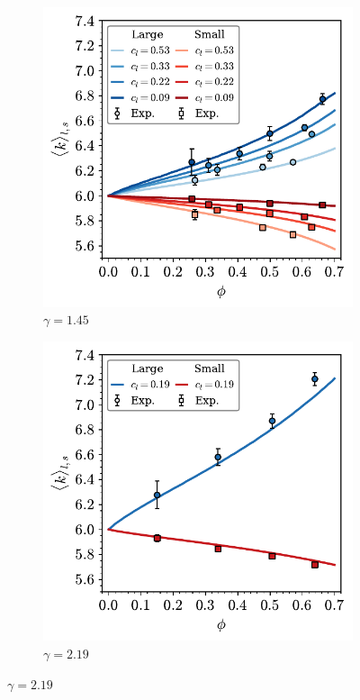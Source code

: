 \begin{figure}[bt]
     \centering
     
      \begin{subfigure}[b]{0.48\textwidth}
         \centering
         \includegraphics[width=\textwidth]{./figures/quasi2d/bi_ssr_phi_k.pdf}
         \caption{$\gamma=1.45$}
         \label{fig:bi1}
     \end{subfigure}
     \hfill
      \begin{subfigure}[b]{0.48\textwidth}
         \centering
         \includegraphics[width=\textwidth]{./figures/quasi2d/bi_lsr_phi_k.pdf}
         \caption{$\gamma=2.19$}
         \label{fig:bi2}
     \end{subfigure}
     \hfill
     

\end{figure}
